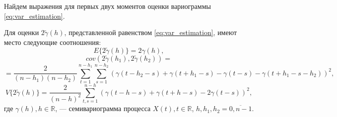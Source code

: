Найдем выражения для первых двух моментов оценки вариограммы \eqref{eq:var_estimation}.
\begin{Theorem}
	Для оценки $ 2 \tilde{\gamma}(h) $, представленной равенством \eqref{eq:var_estimation}, имеют место следующие соотношения:
	\begin{equation}
	\label{eq:est_ex}
		E \{2 \tilde{\gamma}(h) \} = 2 \gamma(h), %
	\end{equation}
	\begin{equation*}
		cov(2 \tilde{\gamma}(h_1), 2 \tilde{\gamma}(h_2)) =
	\end{equation*}
	\begin{equation}
	\label{eq:est_cov}
		= \frac{2}{(n - h_1)(n - h_2)} \sum_{t = 1}^{n - h_1}\sum_{s = 1}^{n - h_2} (\gamma(t - h_2 - s) + \gamma(t + h_1 - s) - \gamma(t - s) - \gamma(t + h_1 - s - h_2))^2,
	\end{equation}
	\begin{equation}
	\label{eq:est_var}
		V \{ 2 \tilde{\gamma}(h) \} = \frac{2}{(n-h)^2}\sum_{t,s = 1}^{n - h} ( \gamma(t - h - s) + \gamma(t + h - s) - 2\gamma(t - s) )^2,
	\end{equation}
	где $ \gamma(h), h \in \mathbb{R} $, --- семивариограмма процесса $ X(t), t \in \mathbb{R}$, $ h, h_1, h_2 = \overline{0, n - 1} $.
\end{Theorem}
